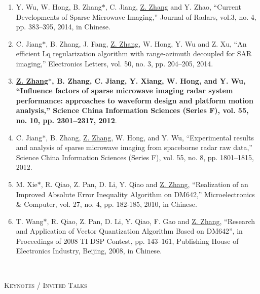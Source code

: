 \documentclass[paper=a4,fontsize=11pt]{scrartcl}
\begin{document}
\begin{enumerate}
\item Y. Wu, W. Hong, B. Zhang$\ast$, C. Jiang, \underline{Z. Zhang} and Y. Zhao, ``Current Developments of Sparse Microwave Imaging,'' Journal of Radars, vol.3, no. 4, pp. 383--395, 2014, in Chinese.

\item C. Jiang$\ast$, B. Zhang, J. Fang, \underline{Z. Zhang}, W. Hong, Y. Wu and Z. Xu, ``An efficient Lq regularization algorithm with range-azimuth decoupled for SAR imaging,'' Electronics Letters, vol. 50, no. 3, pp. 204--205, 2014.

\item \textbf{\underline{Z. Zhang$\ast$}, B. Zhang, C. Jiang, Y. Xiang, W. Hong, and Y. Wu, ``Influence factors of sparse microwave imaging radar system performance: approaches to waveform design and platform motion analysis,'' Science China Information Sciences (Series F), vol. 55, no. 10, pp. 2301--2317, 2012}.

\item C. Jiang$\ast$, B. Zhang, \underline{Z. Zhang}, W. Hong, and Y. Wu, ``Experimental results and analysis of sparse microwave imaging from spaceborne radar raw data,'' Science China Information Sciences (Series F), vol. 55, no. 8, pp. 1801--1815, 2012.


\item M. Xie$\ast$, R. Qiao, Z. Pan, D. Li, Y. Qiao and \underline{Z. Zhang}, ``Realization of an Improved Absolute Error Inequality Algorithm on DM642,'' Microelectronics \& Computer, vol. 27, no. 4, pp. 182-185, 2010, in Chinese.

\item T. Wang$\ast$, R. Qiao, Z. Pan, D. Li, Y. Qiao, F. Gao and \underline{Z. Zhang}, ``Research and Application of Vector Quantization Algorithm Based on DM642'', in Proceedings of 2008 TI DSP Contest, pp. 143--161, Publishing House of Electronics Industry, Beijing, 2008, in Chinese. 

~\\

\end{enumerate}

\textsc{Keynotes / Invited Talks}
\end{document}
